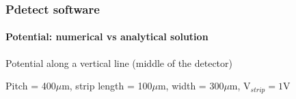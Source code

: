 \documentclass[14pt]{beamer}
\begin{document}
\begin{frame}
  \frametitle{Pdetect software}
  \framesubtitle{Potential: numerical vs analytical solution}

  \fontsize{10pt}{7.2}\selectfont

  Potential along a vertical line (middle of the detector)

  Pitch = 400$\mu$m, strip length = 100$\mu$m, width = 300$\mu$m, V$_{strip} = 1$V

\vspace{-2em}

  \begin{columns}
      \begin{column}{0.5\textwidth}

        \begin{center}
        \end{center}
      \end{column}


\end{columns}
\end{frame}
\end{document}
